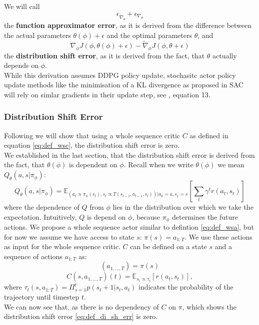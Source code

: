 We will call 
\begin{equation}
    \label{eq:def_func_app_err}
     \epsilon_{\widetilde{\nabla}_{\theta}} + \epsilon_{\nabla_{\theta}}
\end{equation}
the \textbf{function approximator error}, as it is derived from the difference between 
the actual parameters $\theta(\phi) +\epsilon$ and the optimal parameters $\theta$, and \\
\begin{equation}
    \label{eq:def_di_sh_err}
    \nabla_{\phi} J(\phi, \theta(\phi) + \epsilon) - \widetilde{\nabla}_\phi J(\phi, \theta + \epsilon)
\end{equation}
the \textbf{distribution shift error}, as it is derived from the fact, that $\theta$ actually depends on $\phi$. \\
While this derivation assumes DDPG policy update, stochasitc actor policy update methods like the minimisation of a KL divergence as 
proposed in SAC will rely on simlar gradients in their update step, see \cite{haarnoja2018soft}, equation 13.

\subsubsection{Distribution Shift Error}
\label{dist_shift_error_section}
Following we will show that using a whole sequence critic $C$ as defined in equation \ref{eq:def_wsc}, the distribution shift error is zero. \\ 

We established in the last section, that the distribution shift error is derived from the fact, that $\theta(\phi)$ is dependent on $\phi$. 
Recall when we write $\theta(\phi)$ we mean $Q_{\theta}(a,s|\pi_{\phi})$:
\begin{equation*}
    Q_{\theta}(a,s|\pi_{\phi}) = \mathbb{E}_{(a_t \propto \pi_{\phi}(s_t), s_t \propto T(s_{t-1}, a_{t-1}, s_t))|a_0=a, s_1=s}\left[\sum_t \gamma^t r(a_t, s_t)\right]
\end{equation*}
where the dependence of $Q$ from $\phi$ lies in the distribution over which we take the expectation. Intuitively, $Q$ is depend on $\phi$, because $\pi_{\phi}$ determines the 
future actions. We propose a whole sequence actor similar to defintion \ref{eq:def_wsa}, but for now we assume we have access to state $s$: $\pi(s) = a_{1:T}$. 
We use these actions as input for the whole sequence critic. 
$C$ can be defined on a state $s$ and a 
sequence of actions $a_{1:T}$ as: 
\begin{equation*}
    (a_{1,...,T}) = \pi(s)
\end{equation*}
\begin{equation}
    C(s, a_{1,...,T})(t) = \mathbb{E}_{s_t \propto \tau_t}\left[r(a_t, s_t)\right],
\end{equation}
where $\tau_t(s, a_{1:T}) =  \Pi_{s=1}^t p(s_t+1|s_t, a_t)$ indicates the probability of the trajectory until timestep $t$. \\
We can now see that, as there is no dependency of $C$ on $\pi$, which shows the distribution shift error \ref{eq:def_di_sh_err} is zero. 

